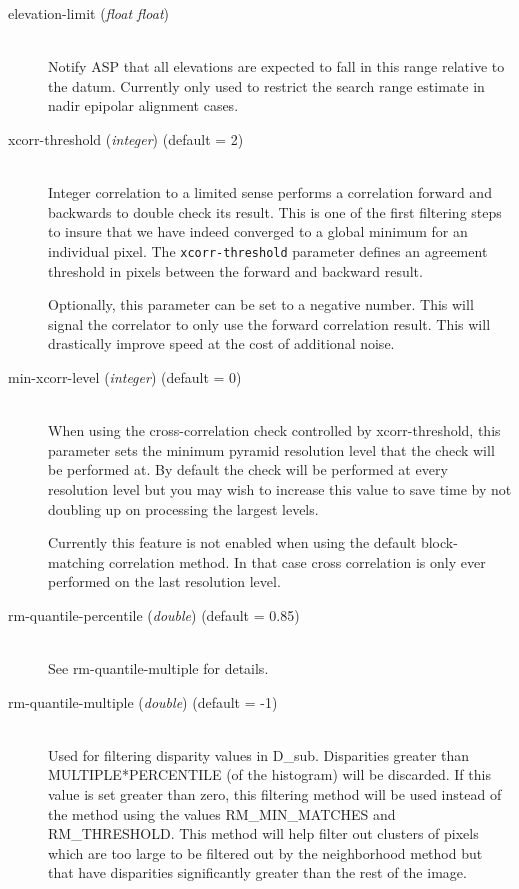 \begin{description}
\item[elevation-limit \textnormal{\small{(\emph{float float})}}] \hfill \\
  Notify ASP that all elevations are expected to fall in this range relative to
  the datum. Currently only used to restrict the search range estimate in 
  nadir epipolar alignment cases.

\item[xcorr-threshold \textnormal{\small{(\emph{integer})}} (default = 2)] \hfill \\

  Integer correlation to a limited sense performs a correlation
  forward and backwards to double check its result. This is one of the
  first filtering steps to insure that we have indeed converged to a
  global minimum for an individual pixel. The \texttt{xcorr-threshold}
  parameter defines an agreement threshold in pixels between the
  forward and backward result.

  Optionally, this parameter can be set to a negative number. This
  will signal the correlator to only use the forward correlation
  result. This will drastically improve speed at the cost of
  additional noise.

\item[min-xcorr-level \textnormal{\small{(\emph{integer})}} (default = 0)] \hfill \\

  When using the cross-correlation check controlled by xcorr-threshold, this parameter
  sets the minimum pyramid resolution level that the check will be performed at.  By 
  default the check will be performed at every resolution level but you may wish to increase
  this value to save time by not doubling up on processing the largest levels.
  
  Currently this feature is not enabled when using the default block-matching correlation
  method.  In that case cross correlation is only ever performed on the last resolution level.


\item[rm-quantile-percentile \textnormal{\small{(\emph{double})}} (default = 0.85)] \hfill \\
  See rm-quantile-multiple for details.

\item[rm-quantile-multiple \textnormal{\small{(\emph{double})}} (default = -1)] \hfill \\
  Used for filtering disparity values in D\_sub.  Disparities 
  greater than MULTIPLE*PERCENTILE (of the histogram) will be discarded.  
  If this value is set greater
  than zero, this filtering method will be used instead of the
  method using the values RM\_MIN\_MATCHES and RM\_THRESHOLD.
  This method will help filter out clusters of pixels which are too large to be
  filtered out by the neighborhood method but that have disparities significantly
  greater than the rest of the image.


\end{description}
